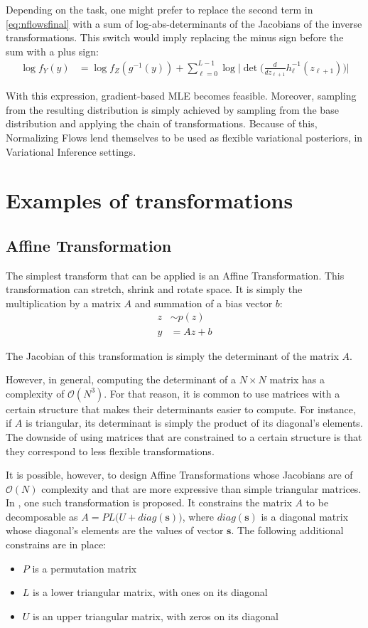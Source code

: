 Depending on the task, one might prefer to replace the second term in \ref{eq:nflowsfinal}
with a sum of log-abs-determinants of the Jacobians of the inverse transformations.
This switch would imply replacing the minus sign before the sum with a plus sign:
\begin{align}
    \log f_Y(y) &= \log f_Z(g^{-1}(y)) + \sum_{\ell=0}^{L-1} \log \Big|\det\Big(\frac{d}{dz_{\ell+1}}h_{\ell}^{-1}(z_{\ell+1})\Big) \Big|
\end{align}

With this expression, gradient-based MLE becomes feasible. Moreover, sampling
from the resulting distribution is simply achieved by sampling from the base
distribution and applying the chain of transformations. Because of this, Normalizing
Flows lend themselves to be used as flexible variational posteriors, in Variational
Inference settings.

\section{Examples of transformations}
\subsection{Affine Transformation}
The simplest transform that can be applied is an Affine Transformation.
This transformation can stretch, shrink and rotate space. It is simply the 
multiplication by a matrix $A$ and summation of a bias vector $b$:
\begin{align}
    z &\sim p(z) \\
    y &= Az + b
\end{align}

The Jacobian of this transformation is simply the determinant of the matrix $A$.

However, in general, computing the determinant of a $N \times N$ matrix has a
complexity of $\mathcal{O}(N^3)$. For that reason, it is common to use matrices
with a certain structure that makes their determinants easier to compute. For
instance, if $A$ is triangular, its determinant is simply the product of its
diagonal's elements. The downside of using matrices that are constrained to
a certain structure is that they correspond to less flexible transformations.

It is possible, however, to design Affine Transformations whose Jacobians are
of $\mathcal{O}(N)$ complexity and that are more expressive than simple
triangular matrices. In \cite{Glow}, one such transformation is proposed. It
constrains the matrix $A$ to be decomposable as $A = PL\big(U + diag(\mathbf{s})\big)$,
where $diag(\mathbf{s})$ is a diagonal matrix whose diagonal's elements are
the values of vector $\mathbf{s}$. The following additional constrains are in place:
\begin{itemize}
    \item $P$ is a permutation matrix
    \item $L$ is a lower triangular matrix, with ones on its diagonal
    \item $U$ is an upper triangular matrix, with zeros on its diagonal
\end{itemize}


